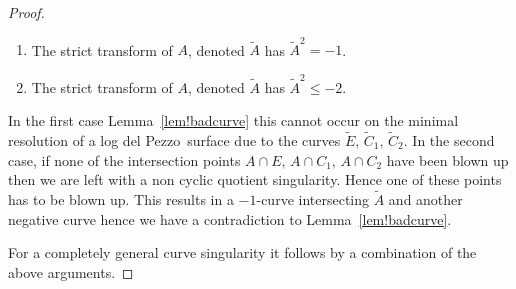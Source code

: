 \documentclass[11pt]{amsbook}
\theoremstyle{definition}
\theoremstyle{definition}
\theoremstyle{definition}
\theoremstyle{definition}
\theoremstyle{definition}
\theoremstyle{definition}
\theoremstyle{definition}
\theoremstyle{definition}
\newcommand{\ldp}{log del Pezzo}
\newcommand{\wt}[1]{\widetilde #1}
\begin{document}
\begin{proof}
\begin{enumerate}
\item
The strict transform of $A$, denoted $\widetilde{A}$ has $\wt{A}^2 = -1$.
\item
The strict transform of $A$, denoted $\widetilde{A}$ has $\wt{A}^2 \leq -2$.
\end{enumerate}

In the first case Lemma~\ref{lem!badcurve} this cannot occur on the minimal resolution of a \ldp\ surface due to the curves $\wt{E}, \, \wt{C_1},\, \wt{C_2}$. In the second case, if none of the intersection points $A\cap E, \, A \cap C_1, \, A \cap C_2$ have been blown up then we are left with a non cyclic quotient singularity. Hence one of these points has to be blown up. This results in a $-1$-curve intersecting $\wt{A}$ and another negative curve hence we have a contradiction to Lemma~\ref{lem!badcurve}.


For a completely general curve singularity it follows by a combination of the above arguments. 
\end{proof}
\end{document}
